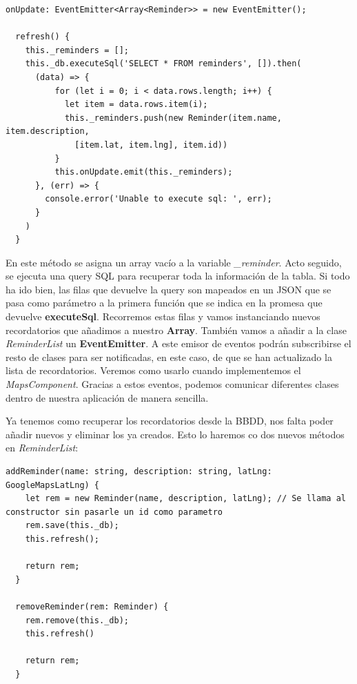 \begin{lstlisting}[style=htmlcssjs,frame=tlrb,xleftmargin={0.2cm}]
  onUpdate: EventEmitter<Array<Reminder>> = new EventEmitter();

  refresh() {
    this._reminders = [];
    this._db.executeSql('SELECT * FROM reminders', []).then(
      (data) => {
          for (let i = 0; i < data.rows.length; i++) {
            let item = data.rows.item(i);
            this._reminders.push(new Reminder(item.name, item.description,
              [item.lat, item.lng], item.id))
          }
          this.onUpdate.emit(this._reminders);
      }, (err) => {
        console.error('Unable to execute sql: ', err);
      }
    )
  }
\end{lstlisting}

En este método se asigna un array vacío a la variable \emph{\_reminder}. Acto seguido, se ejecuta una query \gls{SQL} para recuperar toda la información de la tabla. Si todo ha ido bien, las filas que devuelve la query son mapeados en un \gls{JSON} que se pasa como parámetro a la primera función que se indica en la promesa que devuelve \textbf{executeSql}. Recorremos estas filas y vamos instanciando nuevos recordatorios que añadimos a nuestro \textbf{Array}. También vamos a añadir a la clase \emph{ReminderList} un \textbf{EventEmitter}. A este emisor de eventos podrán subscribirse el resto de clases para ser notificadas, en este caso, de que se han actualizado la lista de recordatorios. Veremos como usarlo cuando implementemos el \emph{MapsComponent}. Gracias a estos eventos, podemos comunicar diferentes clases dentro de nuestra aplicación de manera sencilla.

Ya tenemos como recuperar los recordatorios desde la \gls{BBDD}, nos falta poder añadir nuevos y eliminar los ya creados. Esto lo haremos co dos nuevos métodos en \emph{ReminderList}:

\begin{lstlisting}[style=htmlcssjs,frame=tlrb,xleftmargin={0.2cm}]
  addReminder(name: string, description: string, latLng: GoogleMapsLatLng) {
    let rem = new Reminder(name, description, latLng); // Se llama al constructor sin pasarle un id como parametro
    rem.save(this._db);
    this.refresh();

    return rem;
  }

  removeReminder(rem: Reminder) {
    rem.remove(this._db);
    this.refresh()

    return rem;
  }
\end{lstlisting}

